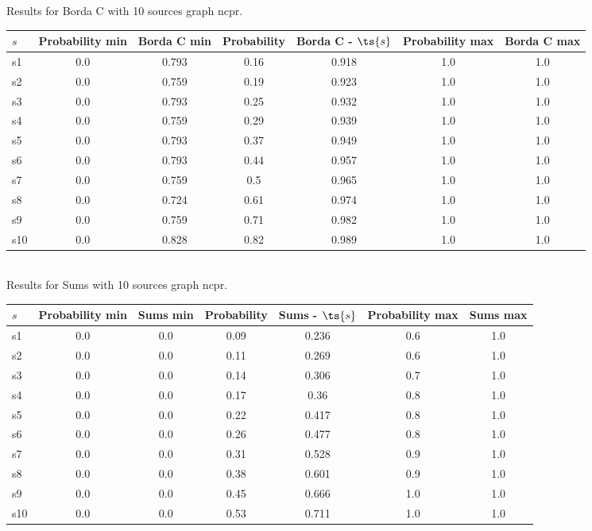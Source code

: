 \documentclass{article}
\begin{document}
\noindent Results for Borda C with 10 sources graph ncpr.

\noindent\begin{tabular}{|l|c|c|c|c|c|c|}
\hline
$s$& Probability min & Borda C min & Probability & Borda C - $\ts{s}$ & Probability max & Borda C max\\
\hline
s1 &0.0 & 0.793 & 0.16 & 0.918 & 1.0 & 1.0\\
\hline
s2 &0.0 & 0.759 & 0.19 & 0.923 & 1.0 & 1.0\\
\hline
s3 &0.0 & 0.793 & 0.25 & 0.932 & 1.0 & 1.0\\
\hline
s4 &0.0 & 0.759 & 0.29 & 0.939 & 1.0 & 1.0\\
\hline
s5 &0.0 & 0.793 & 0.37 & 0.949 & 1.0 & 1.0\\
\hline
s6 &0.0 & 0.793 & 0.44 & 0.957 & 1.0 & 1.0\\
\hline
s7 &0.0 & 0.759 & 0.5 & 0.965 & 1.0 & 1.0\\
\hline
s8 &0.0 & 0.724 & 0.61 & 0.974 & 1.0 & 1.0\\
\hline
s9 &0.0 & 0.759 & 0.71 & 0.982 & 1.0 & 1.0\\
\hline
s10 &0.0 & 0.828 & 0.82 & 0.989 & 1.0 & 1.0\\
\hline
\end{tabular}\\

\noindent Results for Sums with 10 sources graph ncpr.

\noindent\begin{tabular}{|l|c|c|c|c|c|c|}
\hline
$s$& Probability min & Sums min & Probability & Sums - $\ts{s}$ & Probability max & Sums max\\
\hline
s1 &0.0 & 0.0 & 0.09 & 0.236 & 0.6 & 1.0\\
\hline
s2 &0.0 & 0.0 & 0.11 & 0.269 & 0.6 & 1.0\\
\hline
s3 &0.0 & 0.0 & 0.14 & 0.306 & 0.7 & 1.0\\
\hline
s4 &0.0 & 0.0 & 0.17 & 0.36 & 0.8 & 1.0\\
\hline
s5 &0.0 & 0.0 & 0.22 & 0.417 & 0.8 & 1.0\\
\hline
s6 &0.0 & 0.0 & 0.26 & 0.477 & 0.8 & 1.0\\
\hline
s7 &0.0 & 0.0 & 0.31 & 0.528 & 0.9 & 1.0\\
\hline
s8 &0.0 & 0.0 & 0.38 & 0.601 & 0.9 & 1.0\\
\hline
s9 &0.0 & 0.0 & 0.45 & 0.666 & 1.0 & 1.0\\
\hline
s10 &0.0 & 0.0 & 0.53 & 0.711 & 1.0 & 1.0\\
\hline
\end{tabular}\\
\end{document}
